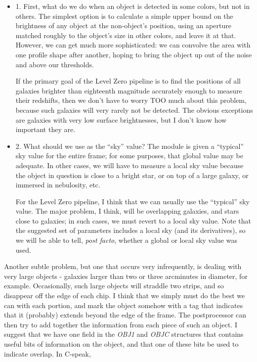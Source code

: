 \begin {itemize}
  \item 1. First, what do we do when an object is detected in some colors,
           but not in others.  The simplest option is to calculate a simple
           upper bound on the brightness of any object at the non-object's 
           position, using an aperture matched roughly to the object's 
           size in other colors, and leave it at that.  However, we can 
           get much more sophisticated: we can convolve the area with 
           one profile shape after another, hoping to bring the object
           up out of the noise and above our thresholds.  

           If the primary goal of the Level Zero pipeline is to find
           the positions of all galaxies brighter than eighteenth magnitude
           accurately enough to measure their redshifts, then we don't have
           to worry TOO much about this problem, because such galaxies
           will very rarely not be detected.  The obvious exceptions are
           galaxies with very low surface brightnesses, but I don't know
           how important they are.

  \item 2. What should we use as the ``sky'' value?  The module is given a 
           ``typical'' sky value for the entire frame; for some purposes,
           that global value may be adequate.  In other cases, we will 
           have to measure a local sky value because the object in question
           is close to a bright star, or on top of a large galaxy, or
           immersed in nebulosity, etc.  

           For the Level Zero pipeline, I think that we can usually use
           the ``typical'' sky value.  The major problem, I think, will be 
           overlapping galaxies, and stars close to galaxies; in such
           cases, we must revert to a local sky value.  Note that the 
           suggested set of parameters includes a local sky (and its 
           derivatives), so we will be able to tell, {\it post facto},
           whether a global or local sky value was used.
\end {itemize}

Another subtle problem, but one that occurs very infrequently,
is dealing with very large objects - galaxies larger than
two or three arcminutes in diameter, for example.  Occasionally,
such large objects will straddle two strips, and so disappear
off the edge of each chip.  I think that we simply must do
the best we can with each portion, and mark the object somehow
with a tag that indicates that it (probably) extends beyond
the edge of the frame.  
The postprocessor can then try to add together the information
from each piece of such an object.
I suggest that we have one field in the
{\it OBJ1} and {\it OBJC} structures that contains useful bits
of information on the object, and that one of these bits 
be used to indicate overlap.  In C-speak,


